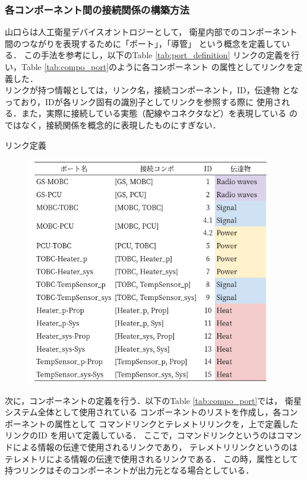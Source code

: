 \documentclass[11pt]{article}
\begin{document}
\subsubsection{各コンポーネント間の接続関係の構築方法}
山口ら\cite{Yamaguchi2014}は人工衛星デバイスオントロジーとして，
衛星内部でのコンポーネント間のつながりを表現するために「ポート」，「導管」%
という概念を定義している．
この手法を参考にし，以下のTable \ref{tab:port_definition}
リンクの定義を行い，Table \ref{tab:compo_port}のように各コンポーネント
の属性としてリンクを定義した．\\
リンクが持つ情報としては，リンク名，接続コンポーネント，ID，伝達物
となっており，IDが各リンク固有の識別子としてリンクを参照する際に
使用される．また，実際に接続している実態（配線やコネクタなど）を表現している
のではなく，接続関係を概念的に表現したものにすぎない．

\newpage
\begin{table}[H]
   \centering
   \caption{リンク定義} 
   \label{tab:port_definition}
\end{table} 
\vspace{-2zh}
\begin{figure}[H]
   \centering
      \includegraphics[height=10cm]{figure/port_definition.png}
\end{figure}
次に，コンポーネントの定義を行う．以下のTable \ref{tab:compo_port}では，
衛星システム全体として使用されている
コンポーネントのリストを作成し，各コンポーネントの属性として
コマンドリンクとテレメトリリンクを，上で定義したリンクのID
を用いて定義している．
ここで，コマンドリンクというのはコマンドによる情報の伝達で使用されるリンクであり，
テレメトリリンクというのはテレメトリによる情報の伝達で使用されるリンクである．
この時，属性として持つリンクはそのコンポーネントが出力元となる場合としている．
\end{document}
